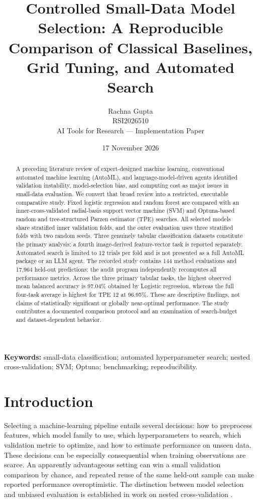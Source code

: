 \documentclass[11pt,a4paper]{article}
\title{Controlled Small-Data Model Selection: A Reproducible Comparison of Classical Baselines, Grid Tuning, and Automated Search}
\author{Rachna Gupta\\ RSI2026510\\ AI Tools for Research --- Implementation Paper}
\date{17 November 2026}
\begin{document}
\maketitle
\begin{abstract}
A preceding literature review of expert-designed machine learning, conventional automated machine learning (AutoML), and language-model-driven agents identified validation instability, model-selection bias, and computing cost as major issues in small-data evaluation. We convert that broad review into a restricted, executable comparative study. Fixed logistic regression and random forest are compared with an inner-cross-validated radial-basis support vector machine (SVM) and Optuna-based random and tree-structured Parzen estimator (TPE) searches. All selected models share stratified inner validation folds, and the outer evaluation uses three stratified folds with two random seeds. Three genuinely tabular classification datasets constitute the primary analysis; a fourth image-derived feature-vector task is reported separately. Automated search is limited to 12 trials per fold and is not presented as a full AutoML package or an LLM agent. The recorded study contains 144 method evaluations and 17,964 held-out predictions; the audit program independently recomputes all performance metrics. Across the three primary tabular tasks, the highest observed mean balanced accuracy is 97.04\% obtained by Logistic regression, whereas the full four-task average is highest for TPE 12 at 96.95\%. These are descriptive findings, not claims of statistically significant or globally near-optimal performance. The study contributes a documented comparison protocol and an examination of search-budget and dataset-dependent behavior.
\end{abstract}
\textbf{Keywords:} small-data classification; automated hyperparameter search; nested cross-validation; SVM; Optuna; benchmarking; reproducibility.

\section{Introduction}
Selecting a machine-learning pipeline entails several decisions: how to preprocess features, which model family to use, which hyperparameters to search, which validation metric to optimize, and how to estimate performance on unseen data. These decisions can be especially consequential when training observations are scarce. An apparently advantageous setting can win a small validation comparison by chance, and repeated reuse of the same held-out sample can make reported performance overoptimistic. The distinction between model selection and unbiased evaluation is established in work on nested cross-validation \cite{varma2006}.
\end{document}
